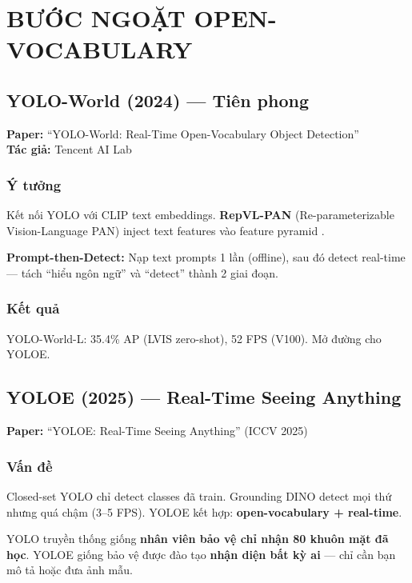 \chapter{BƯỚC NGOẶT OPEN-VOCABULARY}

\section{YOLO-World (2024) --- Tiên phong}
\textbf{Paper:} ``YOLO-World: Real-Time Open-Vocabulary Object Detection'' \cite{yoloworld}\\
\textbf{Tác giả:} Tencent AI Lab

\subsection{Ý tưởng}
Kết nối YOLO với CLIP text embeddings. \textbf{RepVL-PAN} (Re-parameterizable Vision-Language PAN) inject text features vào feature pyramid \cite{yoloworld}.

\textbf{Prompt-then-Detect:} Nạp text prompts 1 lần (offline), sau đó detect real-time --- tách ``hiểu ngôn ngữ'' và ``detect'' thành 2 giai đoạn.

\subsection{Kết quả}
YOLO-World-L: 35.4\% AP (LVIS zero-shot), 52 FPS (V100). Mở đường cho YOLOE.

\section{YOLOE (2025) --- Real-Time Seeing Anything}
\textbf{Paper:} ``YOLOE: Real-Time Seeing Anything'' (ICCV 2025) \cite{yoloe}

\subsection{Vấn đề}
Closed-set YOLO chỉ detect classes đã train. Grounding DINO detect mọi thứ nhưng quá chậm (3--5 FPS). YOLOE kết hợp: \textbf{open-vocabulary + real-time}.

\begin{analogybox}
YOLO truyền thống giống \textbf{nhân viên bảo vệ chỉ nhận 80 khuôn mặt đã học}. YOLOE giống bảo vệ được đào tạo \textbf{nhận diện bất kỳ ai} --- chỉ cần bạn mô tả hoặc đưa ảnh mẫu.
\end{analogybox}

